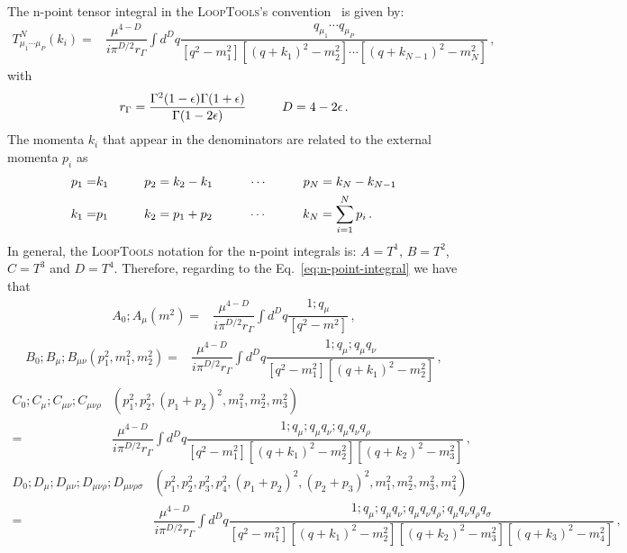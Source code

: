 The n-point tensor integral in the \textsc{LoopTools}'s convention~\cite{Hahn:1998yk} is given by:
\begin{align}
\label{eq:n-point-integral}
T^N_{\mu_{1}\cdots\mu_{P}}(k_i)=&\dfrac{\mu^{4-D}}{i\pi^{D/2}r_{\Gamma}}\int d^Dq \dfrac{q_{\mu_1}\cdots q_{\mu_P}}{[q^2-m_1^2][(q+k_1)^2-m_2^2]\cdots[(q+k_{N-1})^2-m_{N}^2]}\,,
\end{align} 
with
\begin{align}
r_{\Gamma}=\dfrac{\Gamma^2(1-\epsilon)\Gamma(1+\epsilon)}{\Gamma(1-2\epsilon)}\hspace{1.0 cm} D=4-2\epsilon \,.
\end{align} 
\label{eq:ptok}
The momenta $k_i$ that appear in the denominators are related to the external momenta $p_i$ as
\begin{align}
p_1=& k_1 \hspace{1 cm} p_2=k_2-k_1 \hspace{1 cm} \cdots \hspace{1 cm} p_N=k_N-k_{N-1}\nonumber \\
k_1=& p_1 \hspace{1 cm} k_2=p_1+p_2 \hspace{1 cm} \cdots \hspace{1 cm} k_N=\sum_{i=1}^N p_i\,.
\end{align}
%
In general, the \textsc{LoopTools} notation for the n-point integrals is: $A=T^1$, $B=T^2$, $C=T^3$ and $D=T^4$. Therefore, regarding to the Eq.~\eqref{eq:n-point-integral} we have that
%
\begin{align}
\label{eq:A-point-integral}
A_0;A_{\mu}\left(m^2 \right)=&\dfrac{\mu^{4-D}}{i\pi^{D/2}r_{\Gamma}}\int d^Dq \dfrac{ 1;q_{\mu} }{[q^2-m^2]} \,,
\end{align} 
%
\begin{align}
\label{eq:B-point-integral}
B_0;B_{\mu};B_{\mu\nu}\left(p_1^2,m_1^2,m_2^2 \right) 
=&\dfrac{\mu^{4-D}}{i\pi^{D/2}r_{\Gamma}}\int d^Dq \dfrac{ 1;q_{\mu};q_{\mu}q_{\nu} }{[q^2-m_1^2][(q+k_1)^2-m_2^2]} \,,
\end{align} 
%
\begin{align}
\label{eq:C-point-integral}
C_0;C_{\mu};C_{\mu\nu};C_{\mu\nu\rho}&\left(p_1^2,p_2^2,(p_1+p_2)^2,m_1^2,m_2^2,m_3^2\right) \nonumber\\
=&\dfrac{\mu^{4-D}}{i\pi^{D/2}r_{\Gamma}}\int d^Dq \dfrac{ 1;q_{\mu};q_{\mu}q_{\nu};q_{\mu}q_{\nu}q_{\rho} }{[q^2-m_1^2][(q+k_1)^2-m_2^2][(q+k_2)^2-m_3^2]} \,,
\end{align} 
%
\begin{align}
\label{eq:D-point-integral}
D_0;D_{\mu};D_{\mu\nu};D_{\mu\nu\rho};D_{\mu\nu\rho\sigma}&\left(p_1^2,p_2^2,p_3^2,p_4^2,(p_1+p_2)^2,(p_2+p_3)^2,m_1^2,m_2^2,m_3^2,m_4^2\right) \nonumber\\
=&\dfrac{\mu^{4-D}}{i\pi^{D/2}r_{\Gamma}}\int d^Dq \dfrac{ 1;q_{\mu};q_{\mu}q_{\nu};q_{\mu}q_{\nu}q_{\rho};q_{\mu}q_{\nu}q_{\rho}q_{\sigma} }{[q^2-m_1^2][(q+k_1)^2-m_2^2][(q+k_2)^2-m_3^2][(q+k_3)^2-m_4^2]} \,,
\end{align} 
